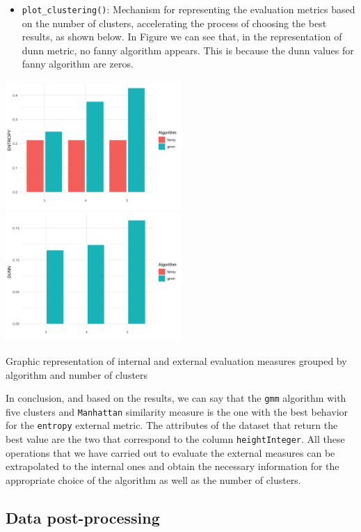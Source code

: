 \documentclass[
]{article}
\providecommand{\tightlist}{%
  \setlength{\itemsep}{0pt}\setlength{\parskip}{0pt}}
\begin{document}
\begin{itemize}
\tightlist
\item
  \texttt{plot\_clustering()}: Mechanism for representing the evaluation
  metrics based on the number of clusters, accelerating the process of
  choosing the best results, as shown below. In Figure we can see that,
  in the representation of dunn metric, no fanny algorithm appears. This
  is because the dunn values for fanny algorithm are zeros.
\end{itemize}

\hypertarget{fig:coolFig}{}
\includegraphics[width=0.5\textwidth,height=\textheight]{img/entropy.png}
\includegraphics[width=0.5\textwidth,height=\textheight]{img/dunn.png}

Graphic representation of internal and external evaluation measures
grouped by algorithm and number of clusters

In conclusion, and based on the results, we can say that the
\texttt{gmm} algorithm with five clusters and \texttt{Manhattan}
similarity measure is the one with the best behavior for the
\texttt{entropy} external metric. The attributes of the dataset that
return the best value are the two that correspond to the column
\texttt{heightInteger}. All these operations that we have carried out to
evaluate the external measures can be extrapolated to the internal ones
and obtain the necessary information for the appropriate choice of the
algorithm as well as the number of clusters.

\hypertarget{data-post-processing}{%
\subsection{Data post-processing}\label{data-post-processing}}
\end{document}
